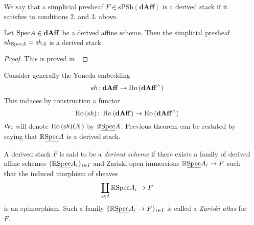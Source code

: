 \begin{refsection}
\begin{defin}
We say that a simplicial presheaf $F \in \mathrm{sPSh}(\mathbf{dAff})$ is a derived stack if it satisfies to conditions 2. and 3. above.
\end{defin}

\begin{thm}
Let $\mathrm{Spec} A \in \mathbf{dAff}$ be a derived affine scheme. Then the simplicial presheaf $\mathrm s h_{\mathrm{Spec} A} = \mathrm s h_A$ is a derived stack.
\end{thm}

\begin{proof}
This is proved in \cite{hagII}.
\end{proof}

Consider generally the Yoneda embedding
\[
\mathrm s h \colon \mathbf{dAff} \to \operatorname{\mathrm{Ho} \,}(\mathbf{dAff}^\wedge)
\]
This induces by construction a functor
\[
\operatorname{\mathrm{Ho} \,}(\mathrm s h) \colon \operatorname{\mathrm{Ho} \,}(\mathbf{dAff}) \to \operatorname{\mathrm{Ho} \,}(\mathbf{dAff}^\wedge)
\]
We will denote $\operatorname{\mathrm{Ho} \,}(\mathrm sh)(X)$ by $\mathbb{R} \underline{\mathrm{Spec}} A$. Previous theorem can be restated by saying that $\mathbb{R} \underline{\mathrm{Spec}} A$ is a derived stack.

\begin{defin}
A derived stack $F$ is said to be a \emph{derived scheme} if there exists a family of derived affine schemes $\{\mathbb{R} \underline{\mathrm{Spec}} A_i\}_{i \in I}$ and Zariski open immersions $\mathbb{R} \underline{\mathrm{Spec}} A_i \to F$ such that the induced morphism of sheaves
\[
\coprod_{i \in I} \mathbb{R} \underline{\mathrm{Spec}} A_i \to F
\]
is an epimorphism. Such a family $\{\mathbb{R} \underline{\mathrm{Spec}} A_i \to F\}_{i \in I}$ is called a \emph{Zariski atlas} for $F$.
\end{defin}


\end{refsection}
